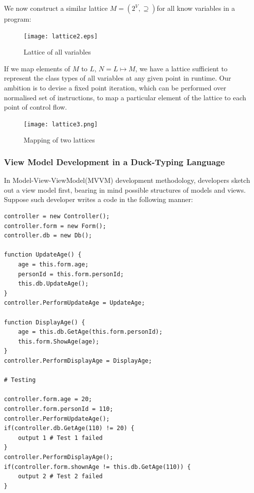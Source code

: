 \documentclass[a4paper,12pt]{article}
\begin{document}
We now construct a similar lattice $M = (2^V, \supseteq)$for all know variables in a program:\\
\begin{figure}[H]
	\texttt{[image: lattice2.eps]}
	\centering
	\caption{Lattice of all variables}
\end{figure}
If we map elements of $M$ to $L$, $N = L \mapsto M$, we have a lattice sufficient to represent the class types of all variables at any given point in runtime. Our ambition is to devise a fixed point iteration, which can be performed over normalised set of instructions, to map a particular element of the lattice to each point of control flow.\\
\begin{figure}[H]
	\texttt{[image: lattice3.png]}
	\centering
	\caption{Mapping of two lattices}
\end{figure}

\subsubsection{View Model Development in a Duck-Typing Language}
In Model-View-ViewModel(MVVM) development methodology, developers sketch out a view model first, bearing in mind possible structures of models and views. Suppose such developer writes a code in the following manner:\\
\begin{lstlisting}[caption=Controller written in a Duck-Typing language]
controller = new Controller();
controller.form = new Form();
controller.db = new Db();

function UpdateAge() {
	age = this.form.age;
	personId = this.form.personId;
	this.db.UpdateAge();
}
controller.PerformUpdateAge = UpdateAge;

function DisplayAge() {
	age = this.db.GetAge(this.form.personId);
	this.form.ShowAge(age);
}
controller.PerformDisplayAge = DisplayAge;

# Testing

controller.form.age = 20;
controller.form.personId = 110;
controller.PerformUpdateAge();
if(controller.db.GetAge(110) != 20) {
	output 1 # Test 1 failed
}
controller.PerformDisplayAge();
if(controller.form.shownAge != this.db.GetAge(110)) {
	output 2 # Test 2 failed
}
\end{lstlisting}
\end{document}
